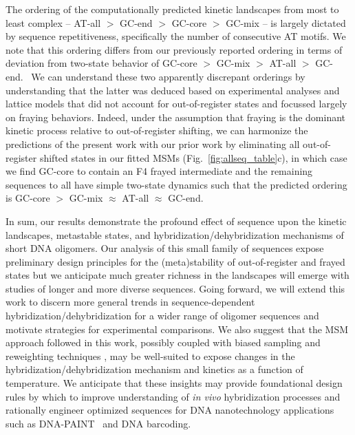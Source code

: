 \documentclass[journal=jpcbfk,manuscript=article]{achemso}
\newcommand*{\rood}[1]{{#1}}
\begin{document}
The ordering of the computationally predicted kinetic landscapes from most to least complex -- AT-all $>$ GC-end $>$ GC-core $>$ GC-mix -- is largely dictated by sequence repetitiveness, specifically the number of consecutive AT motifs. We note that this ordering differs from our previously reported ordering in terms of deviation from two-state behavior of GC-core $>$ GC-mix $>$ AT-all $>$ GC-end.~\citep{Sanstead2016, Sanstead2018DirectDehybridization} We can understand these two apparently discrepant orderings by understanding that the latter was deduced based on experimental analyses and lattice models that did not account for out-of-register states and focussed largely on fraying behaviors. Indeed, under the assumption that fraying is the dominant kinetic process relative to out-of-register shifting, we  can harmonize the predictions of the present work with our prior work by eliminating all out-of-register shifted states in our fitted MSMs (Fig.~\ref{fig:allseq_table}c), in which case we find GC-core to contain an F4 frayed intermediate and the remaining sequences to all have simple two-state dynamics such that the predicted ordering is GC-core $>$ GC-mix $\approx$ AT-all $\approx$ GC-end.

In sum, our results demonstrate the profound effect of sequence upon the kinetic landscapes, metastable states, and hybridization/dehybridization mechanisms of short DNA oligomers. Our analysis of this small family of sequences expose preliminary design principles for the (meta)stability of out-of-register and frayed states but we anticipate much greater richness in the landscapes will emerge with studies of longer and more diverse sequences. Going forward, we will extend this work to discern more general trends in sequence-dependent hybridization/dehybridization for a wider range of oligomer sequences and motivate strategies for experimental comparisons. \rood{We also suggest that the MSM approach followed in this work, possibly coupled with biased sampling and reweighting techniques \citep{Wu2014StatisticallyStates, Scherer2015PyEMMAModels}, may be well-suited to expose changes in the hybridization/dehybridization mechanism and kinetics as a function of temperature.} We anticipate that these insights may provide foundational design rules by which to improve understanding of \emph{in vivo} hybridization processes and rationally engineer optimized sequences for DNA nanotechnology applications such as DNA-PAINT~\citep{Strauss2020UpDNA-PAINT} and DNA barcoding.~\citep{Shah2019} 
\end{document}
